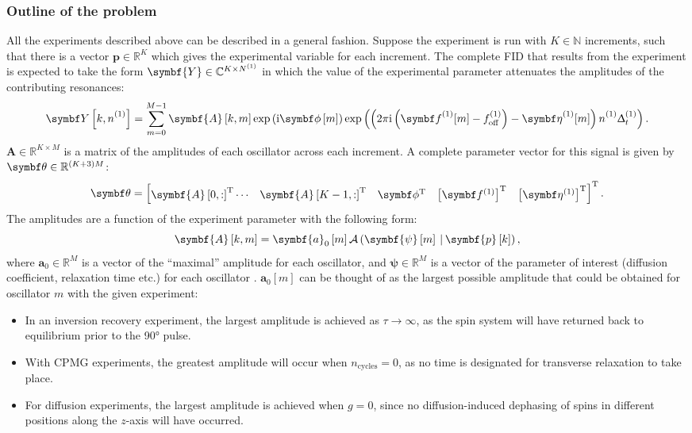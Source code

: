 \subsubsection{Outline of the problem}
All the experiments described above can be described in a general fashion.
Suppose the experiment is run with $K \in \mathbb{N}$ increments, such that there is a
vector  $\symbf{p} \in \mathbb{R}^K$ which gives the experimental variable for
each increment.
The complete \ac{FID} that results from the experiment is expected to take the
form $\symbf{Y} \in \mathbb{C}^{K \times \None}$ in which the value of the
experimental parameter attenuates the amplitudes of the contributing
resonances:
\begin{equation}
    \bY\left[k, \none\right] = \sum_{m=0}^{M-1} \symbf{A}\left[k, m\right]  \exp\left(\iu \bdphim \right)
    \exp\left(\left(2 \pi \iu \left(\bdfone_{\vphantom{\text{off}}} [m] -
    \foffone\right) - \bdetaone_{\vphantom{\text{off}}} [m] \right) \none
\Dtone\right).
\end{equation}
$\symbf{A} \in \mathbb{R}^{K \times M}$ is a matrix of the amplitudes of
each oscillator across each increment. A complete parameter vector for this
signal is given by $\bth \in \mathbb{R}^{(K + 3)M}$:
\begin{equation}
    \bth =
    \begin{bmatrix}
        \symbf{A}\left[0, :\right]\T \cdots & \symbf{A}\left[K-1, :\right]\T &
        \bdphi\T & \left[\bdfone\right]\T & \left[\bdetaone\right]\T
    \end{bmatrix}\T.
\end{equation}
The amplitudes are a function of the experiment parameter with the following
form:
\begin{equation}
    \symbf{A}\left[k, m\right] =
        \symbf{a}_0 \left[m\right]
        \mathcal{A} \left(
            \symbf{\psi}\left[m\right] \hspace*{2pt} | \hspace*{2pt}
            \symbf{p}\left[k\right]
        \right),
\end{equation}
where $\symbf{a}_0 \in \mathbb{R}^{M}$ is a vector of the ``maximal''
amplitude for each oscillator, and $\symbf{\psi} \in \mathbb{R}^M$ is a vector
of the parameter of interest (diffusion coefficient, relaxation time etc.) for
each oscillator . $\symbf{a}_0 [m]$ can be thought of as the largest
possible amplitude that could be obtained for oscillator $m$ with the given
experiment:
\begin{itemize}
    \item In an inversion recovery experiment, the largest amplitude is
        achieved as $\tau \rightarrow \infty$, as the spin system will have
        returned back to equilibrium prior to the \ang{90} pulse.
    \item With \ac{CPMG} experiments, the greatest amplitude will occur when
        $n_{\text{cycles}} = 0$, as no time is designated for transverse
        relaxation to take place.
    \item For diffusion experiments, the largest amplitude is achieved when
        $g=0$, since no diffusion-induced dephasing of spins in different
        positions along the $z$-axis will have occurred.
\end{itemize}
